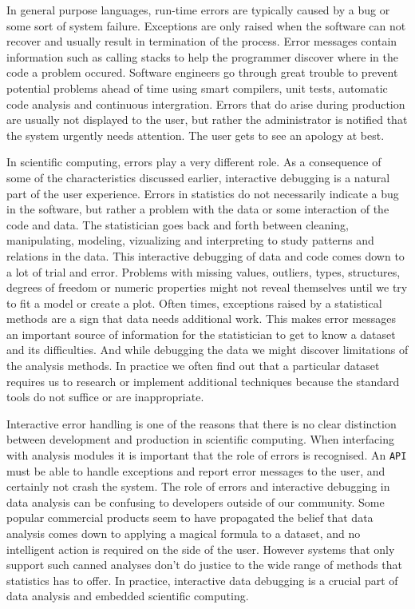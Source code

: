 \documentclass{article}
\newcommand{\API}{\texttt{API}\xspace}
\begin{document}
In general purpose languages, run-time errors are typically caused by a bug or some sort of system failure. Exceptions are only raised when the software can not recover and usually result in termination of the process. Error messages contain information such as calling stacks to help the programmer discover where in the code a problem occured. Software engineers go through great trouble to prevent potential problems ahead of time using smart compilers, unit tests, automatic code analysis and continuous intergration. Errors that do arise during production are usually not displayed to the user, but rather the administrator is notified that the system urgently needs attention. The user gets to see an apology at best.

In scientific computing, errors play a very different role. As a consequence of some of the characteristics discussed earlier, interactive debugging is a natural part of the user experience. Errors in statistics do not necessarily indicate a bug in the software, but rather a problem with the data or some interaction of the code and data. The statistician goes back and forth between cleaning, manipulating, modeling, vizualizing and interpreting to study patterns and relations in the data. This interactive debugging of data and code comes down to a lot of trial and error. Problems with missing values, outliers, types, structures, degrees of freedom or numeric properties might not reveal themselves until we try to fit a model or create a plot. Often times, exceptions raised by a statistical methods are a sign that data needs additional work. This makes error messages an important source of information for the statistician to get to know a dataset and its difficulties. And while debugging the data we might discover limitations of the analysis methods. In practice we often find out that a particular dataset requires us to research or implement additional techniques because the standard tools do not suffice or are inappropriate.

Interactive error handling is one of the reasons that there is no clear distinction between development and production in scientific computing. When interfacing with analysis modules it is important that the role of errors is recognised. An \API must be able to handle exceptions and report error messages to the user, and certainly not crash the system. The role of errors and interactive debugging in data analysis can be confusing to developers outside of our community. Some popular commercial products seem to have propagated the belief that data analysis comes down to applying a magical formula to a dataset, and no intelligent action is required on the side of the user. However systems that only support such canned analyses don't do justice to the wide range of methods that statistics has to offer. In practice, interactive data debugging is a crucial part of data analysis and embedded scientific computing.
\end{document}
